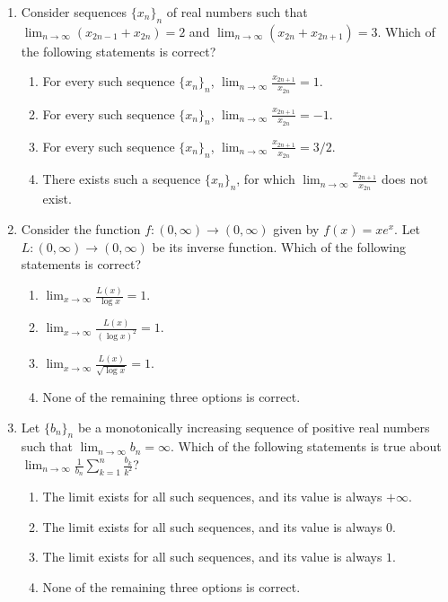 \documentclass[11pt, a4paper]{article}
\begin{document}
\begin{enumerate}
  \item Consider sequences $\{x_n\}_n$ of real numbers such that $\lim_{n \to \infty} (x_{2n-1} + x_{2n}) = 2$ and $\lim_{n \to \infty} (x_{2n} + x_{2n+1}) = 3$. Which of the following statements is correct?
  \begin{enumerate}[label=(\alph*)]
    \item For every such sequence $\{x_n\}_n$, $\lim_{n \to \infty} \frac{x_{2n+1}}{x_{2n}} = 1$.
    \item For every such sequence $\{x_n\}_n$, $\lim_{n \to \infty} \frac{x_{2n+1}}{x_{2n}} = -1$.
    \item For every such sequence $\{x_n\}_n$, $\lim_{n \to \infty} \frac{x_{2n+1}}{x_{2n}} = 3/2$.
    \item There exists such a sequence $\{x_n\}_n$, for which $\lim_{n \to \infty} \frac{x_{2n+1}}{x_{2n}}$ does not exist.
  \end{enumerate}

  \item Consider the function $f: (0,\infty) \to (0,\infty)$ given by $f(x) = x e^x$. Let $L: (0,\infty) \to (0,\infty)$ be its inverse function. Which of the following statements is correct?
  \begin{enumerate}[label=(\alph*)]
    \item $\lim_{x \to \infty} \frac{L(x)}{\log x} = 1$.
    \item $\lim_{x \to \infty} \frac{L(x)}{(\log x)^2} = 1$.
    \item $\lim_{x \to \infty} \frac{L(x)}{\sqrt{\log x}} = 1$.
    \item None of the remaining three options is correct.
  \end{enumerate}

  \item Let $\{b_n\}_n$ be a monotonically increasing sequence of positive real numbers such that $\lim_{n \to \infty} b_n = \infty$. Which of the following statements is true about $\displaystyle \lim_{n \to \infty} \frac{1}{b_n} \sum_{k=1}^n \frac{b_k}{k^2}$?
  \begin{enumerate}[label=(\alph*)]
    \item The limit exists for all such sequences, and its value is always $+\infty$.
    \item The limit exists for all such sequences, and its value is always $0$.
    \item The limit exists for all such sequences, and its value is always $1$.
    \item None of the remaining three options is correct.
  \end{enumerate}


\end{enumerate}
\end{document}

